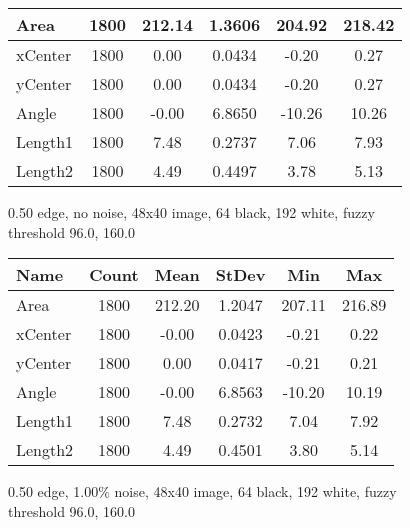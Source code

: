 \documentclass{article}
\begin{document}
\begin{doublespace}
\begin{figure}[ht!]
\begin{tabular}{| l | c | c | c | c | c |}
    Area  & 1800 &  212.14 &  1.3606  & 204.92 &  218.42 \\ \hline
 xCenter  & 1800 &    0.00 &  0.0434  &  -0.20 &    0.27 \\ \hline
 yCenter  & 1800 &    0.00 &  0.0434  &  -0.20 &    0.27 \\ \hline
   Angle  & 1800 &   -0.00 &  6.8650  & -10.26 &   10.26 \\ \hline
 Length1  & 1800 &    7.48 &  0.2737  &   7.06 &    7.93 \\ \hline
 Length2  & 1800 &    4.49 &  0.4497  &   3.78 &    5.13 \\ \hline
  \end{tabular}
\caption{0.50 edge, no noise, 48x40 image, 64 black, 192 white, fuzzy threshold 96.0, 160.0}
\end{figure}

\begin{figure}[ht!]
\centering
  \setlength{\tabcolsep}{15pt}
  \begin{tabular}{| l | c | c | c | c | c |}
    \hline
  Name    &Count &    Mean &   StDev  &    Min &     Max \\ \hline
    Area  & 1800 &  212.20 &  1.2047  & 207.11 &  216.89 \\ \hline
 xCenter  & 1800 &   -0.00 &  0.0423  &  -0.21 &    0.22 \\ \hline
 yCenter  & 1800 &    0.00 &  0.0417  &  -0.21 &    0.21 \\ \hline
   Angle  & 1800 &   -0.00 &  6.8563  & -10.20 &   10.19 \\ \hline
 Length1  & 1800 &    7.48 &  0.2732  &   7.04 &    7.92 \\ \hline
 Length2  & 1800 &    4.49 &  0.4501  &   3.80 &    5.14 \\ \hline
  \end{tabular}
\caption{0.50 edge,  1.00\% noise, 48x40 image, 64 black, 192 white, fuzzy threshold 96.0, 160.0}
\end{figure}


\end{doublespace}
\end{document}
